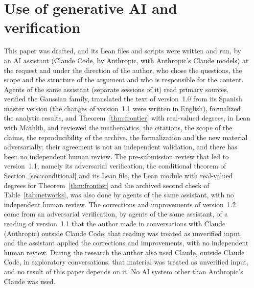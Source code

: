 \documentclass[a4paper,onecolumn,superscriptaddress,10pt,unpublished]{compositionalityarticle}
\begin{document}
\section*{Use of generative AI and verification}\label{sec:ai}
This paper was drafted, and its Lean files and scripts were written and run, by an AI assistant (Claude Code, by Anthropic, with Anthropic's Claude models) at the request and under the direction of the author, who chose the questions, the scope and the structure of the argument and who is responsible for the content. Agents of the same assistant (separate sessions of it) read primary sources, verified the Gaussian family, translated the text of version~1.0 from its Spanish master version (the changes of version~1.1 were written in English), formalized the analytic results, and Theorem~\ref{thm:frontier} with real-valued degrees, in Lean with Mathlib, and reviewed the mathematics, the citations, the scope of the claims, the reproducibility of the archive, the formalization and the new material adversarially; their agreement is not an independent validation, and there has been no independent human review. The pre-submission review that led to version~1.1, namely its adversarial verification, the conditional theorem of Section~\ref{sec:conditional} and its Lean file, the Lean module with real-valued degrees for Theorem~\ref{thm:frontier} and the archived second check of Table~\ref{tab:networks}, was also done by agents of the same assistant, with no independent human review. The corrections and improvements of version~1.2 come from an adversarial verification, by agents of the same assistant, of a reading of version~1.1 that the author made in conversations with Claude (Anthropic) outside Claude Code; that reading was treated as unverified input, and the assistant applied the corrections and improvements, with no independent human review. During the research the author also used Claude, outside Claude Code, in exploratory conversations; that material was treated as unverified input, and no result of this paper depends on it. No AI system other than Anthropic's Claude was used.
\end{document}
